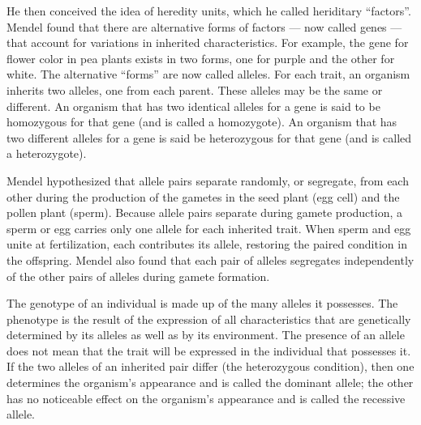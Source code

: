 He then conceived the idea of heredity units, which he called heriditary ``factors''. Mendel found that there are alternative forms of factors --- now called genes --- that account for variations in inherited characteristics. For example, the gene for flower color in pea plants exists in two forms, one for purple and the other for white. The alternative ``forms'' are now called alleles. For each trait, an organism inherits two alleles, one from each parent. These alleles may be the same or different. An organism that has two identical alleles for a gene is said to be homozygous for that gene (and is called a homozygote). An organism that has two different alleles for a gene is said be heterozygous for that gene (and is called a heterozygote).

Mendel hypothesized that allele pairs separate randomly, or segregate, from each other during the production of the gametes in the seed plant (egg cell) and the pollen plant (sperm). Because allele pairs separate during gamete production, a sperm or egg carries only one allele for each inherited trait. When sperm and egg unite at fertilization, each contributes its allele, restoring the paired condition in the offspring. Mendel also found that each pair of alleles segregates independently of the other pairs of alleles during gamete formation.

The genotype of an individual is made up of the many alleles it possesses. The phenotype is the result of the expression of all characteristics that are genetically determined by its alleles as well as by its environment. The presence of an allele does not mean that the trait will be expressed in the individual that possesses it. If the two alleles of an inherited pair differ (the heterozygous condition), then one determines the organism's appearance and is called the dominant allele; the other has no noticeable effect on the organism's appearance and is called the recessive allele.

